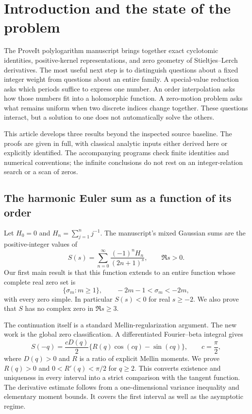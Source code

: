 \section{Introduction and the state of the problem}
\label{sec:introduction}

The ProveIt polylogarithm manuscript brings together exact cyclotomic
identities, positive-kernel representations, and zero geometry of
Stieltjes--Lerch derivatives. The most useful next step is to distinguish
questions about a fixed integer weight from questions about an entire
family. A special-value reduction asks which periods suffice to express
one number. An order interpolation asks how those numbers fit into a
holomorphic function. A zero-motion problem asks what remains uniform
when two discrete indices change together. These questions interact, but
a solution to one does not automatically solve the others.

This article develops three results beyond the inspected source baseline.
The proofs are given in full, with classical analytic inputs either
derived here or explicitly identified. The accompanying programs check
finite identities and numerical conventions; the infinite conclusions
do not rest on an integer-relation search or a scan of zeros.

\subsection{The harmonic Euler sum as a function of its order}

Let $H_0=0$ and $H_n=\sum_{j=1}^n j^{-1}$. The manuscript's mixed
Gaussian sums are the positive-integer values of
\[
 S(s)=\sum_{n=0}^{\infty}\frac{(-1)^nH_n}{(2n+1)^s},
 \qquad \Re s>0.
\]
Our first main result is that this function extends to an entire function
whose complete real zero set is
\[
 \{\sigma_m:m\ge1\},\qquad -2m-1<\sigma_m<-2m,
\]
with every zero simple. In particular $S(s)<0$ for real $s\ge-2$.
We also prove that $S$ has no complex zero in $\Re s\ge3$.

The continuation itself is a standard Mellin-regularization argument.
The new work is the global zero classification. A differentiated
Fourier--beta integral gives
\[
 S(-q)=\frac{cD(q)}2\{R(q)\cos(cq)-\sin(cq)\},\qquad c=\frac\pi2,
\]
where $D(q)>0$ and $R$ is a ratio of explicit Mellin moments.
We prove $R(q)>0$ and $0<R'(q)<\pi/2$ for $q\ge2$. This converts
existence and uniqueness in every interval into a strict comparison
with the tangent function. The derivative estimate follows from a
one-dimensional variance inequality and elementary moment bounds.
It covers the first interval as well as the asymptotic regime.

